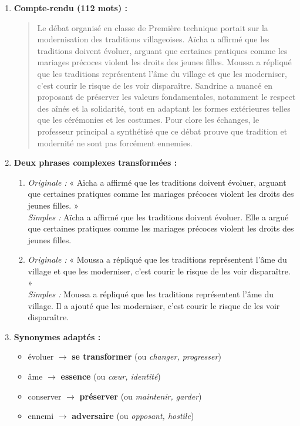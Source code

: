 \documentclass[11pt]{article}
\begin{document}
\begin{corrige}
\begin{enumerate}
\item \textbf{Compte-rendu (112 mots) :}
\begin{quote}
Le débat organisé en classe de Première technique portait sur la modernisation des traditions villageoises. Aïcha a affirmé que les traditions doivent évoluer, arguant que certaines pratiques comme les mariages précoces violent les droits des jeunes filles. Moussa a répliqué que les traditions représentent l'âme du village et que les moderniser, c'est courir le risque de les voir disparaître. Sandrine a nuancé en proposant de préserver les valeurs fondamentales, notamment le respect des aînés et la solidarité, tout en adaptant les formes extérieures telles que les cérémonies et les costumes. Pour clore les échanges, le professeur principal a synthétisé que ce débat prouve que tradition et modernité ne sont pas forcément ennemies.
\end{quote}
\item \textbf{Deux phrases complexes transformées :}
\begin{enumerate}
\item \emph{Originale :} « Aïcha a affirmé que les traditions doivent évoluer, arguant que certaines pratiques comme les mariages précoces violent les droits des jeunes filles. »\\
\emph{Simples :} Aïcha a affirmé que les traditions doivent évoluer. Elle a argué que certaines pratiques comme les mariages précoces violent les droits des jeunes filles.
\item \emph{Originale :} « Moussa a répliqué que les traditions représentent l'âme du village et que les moderniser, c'est courir le risque de les voir disparaître. »\\
\emph{Simples :} Moussa a répliqué que les traditions représentent l'âme du village. Il a ajouté que les moderniser, c'est courir le risque de les voir disparaître.
\end{enumerate}
\item \textbf{Synonymes adaptés :}
\begin{itemize}
\item évoluer $\rightarrow$ \textbf{se transformer} (ou \emph{changer, progresser})
\item âme $\rightarrow$ \textbf{essence} (ou \emph{cœur, identité})
\item conserver $\rightarrow$ \textbf{préserver} (ou \emph{maintenir, garder})
\item ennemi $\rightarrow$ \textbf{adversaire} (ou \emph{opposant, hostile})
\end{itemize}
\end{enumerate}
\end{corrige}
\end{document}
